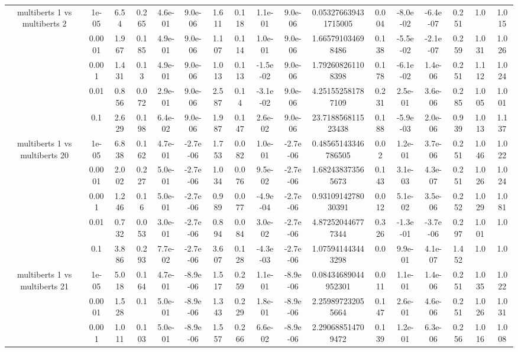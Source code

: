 \begin{tabular}{|c|c|c|c|c|c|c|c|c|c|c|c|c|c|c|c|c|}
\hline
\multirow{5}{*}{multiberts 1 vs multiberts 2} & 1e-05 & 6.54 & 0.265 & 4.6e-01 & 9.0e-06 & 1.611 & 0.118 & 1.1e-01 & 9.0e-06 & 0.053276639431715005 & 0.004 & -8.0e-02 & -6.4e-07 & 0.251 & 1.0 & 1.015 \\
 & 0.0001 & 1.967 & 0.185 & 4.9e-01 & 9.0e-06 & 1.107 & 0.114 & 1.0e-01 & 9.0e-06 & 1.665791034698486 & 0.138 & -5.5e-02 & -2.1e-07 & 0.259 & 1.031 & 1.026 \\
 & 0.001 & 1.431 & 0.13 & 4.9e-01 & 9.0e-06 & 1.013 & 0.113 & -1.5e-02 & 9.0e-06 & 1.792608261108398 & 0.178 & -6.1e-02 & 1.4e-06 & 0.251 & 1.112 & 1.024 \\
 & 0.01 & 0.856 & 0.072 & 2.9e-01 & 9.0e-06 & 2.587 & 0.14 & -3.1e-02 & 9.0e-06 & 4.251552581787109 & 0.231 & 2.5e-01 & 3.6e-06 & 0.285 & 1.005 & 1.001 \\
 & 0.1 & 2.629 & 0.198 & 6.4e-02 & 9.0e-06 & 1.987 & 0.147 & 2.6e-02 & 9.0e-06 & 23.718856811523438 & 0.188 & -5.9e-03 & 2.0e-06 & 0.939 & 1.013 & 1.137 \\
\hline
\multirow{5}{*}{multiberts 1 vs multiberts 20} & 1e-05 & 6.838 & 0.162 & 4.7e-01 & -2.7e-06 & 1.753 & 0.082 & 1.0e-01 & -2.7e-06 & 0.48565143346786505 & 0.02 & 1.2e-01 & 3.7e-06 & 0.251 & 1.046 & 1.022 \\
 & 0.0001 & 2.002 & 0.227 & 5.0e-01 & -2.7e-06 & 1.034 & 0.076 & 9.5e-02 & -2.7e-06 & 1.682438373565673 & 0.143 & 3.1e-03 & 4.3e-07 & 0.251 & 1.026 & 1.024 \\
 & 0.001 & 1.246 & 0.16 & 5.0e-01 & -2.7e-06 & 0.989 & 0.077 & -4.9e-04 & -2.7e-06 & 0.9310914278030391 & 0.012 & 5.1e-02 & 3.5e-06 & 0.252 & 1.029 & 1.081 \\
 & 0.01 & 0.732 & 0.053 & 3.0e-01 & -2.7e-06 & 0.894 & 0.084 & 3.0e-02 & -2.7e-06 & 4.872520446777344 & 0.326 & -1.3e-01 & -3.7e-06 & 0.297 & 1.001 & 1.0 \\
 & 0.1 & 3.886 & 0.293 & 7.7e-02 & -2.7e-06 & 3.607 & 0.128 & -4.3e-03 & -2.7e-06 & 1.075941443443298 & 0.0 & 9.9e-01 & 4.1e-07 & 1.452 & 1.0 & 1.0 \\
\hline
\multirow{5}{*}{multiberts 1 vs multiberts 21} & 1e-05 & 5.018 & 0.164 & 4.7e-01 & -8.9e-06 & 1.517 & 0.259 & 1.1e-01 & -8.9e-06 & 0.08434689044952301 & 0.011 & 1.1e-01 & 1.4e-06 & 0.251 & 1.035 & 1.022 \\
 & 0.0001 & 1.528 & 0.1 & 5.0e-01 & -8.9e-06 & 1.343 & 0.229 & 1.8e-01 & -8.9e-06 & 2.259897232055664 & 0.147 & 2.6e-01 & 4.6e-06 & 0.251 & 1.026 & 1.031 \\
 & 0.001 & 1.011 & 0.103 & 5.0e-01 & -8.9e-06 & 1.557 & 0.266 & 6.6e-02 & -8.9e-06 & 2.290688514709472 & 0.139 & 1.2e-01 & 6.3e-06 & 0.256 & 1.016 & 1.008 \\

\end{tabular}
